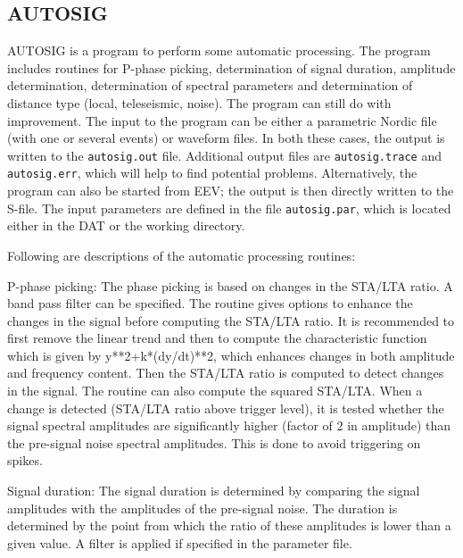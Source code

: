 
\subsection{AUTOSIG}


AUTOSIG is a program to perform some automatic processing. The program 
includes routines for P-phase picking, determination of signal duration, amplitude determination, determination of spectral parameters \citep{ottemoller2003} and determination of distance type (local, teleseismic, noise). The program can still do with improvement. The input to the program can be either a parametric Nordic file (with one or several events) or waveform files. In both these cases, the output is written to the \texttt{autosig.out} file. Additional output files are \texttt{autosig.trace} and \texttt{autosig.err}, which will help to find potential problems. Alternatively, the program can also be started from EEV; the output is then directly written to the S-file. The input parameters are defined in the file \texttt{autosig.par}, which is located either in the DAT or the working directory.  

Following are descriptions of the automatic processing routines: 

P-phase picking:\newline
{} 
The phase picking is based on changes in the STA/LTA ratio. A band pass filter can be specified. The routine gives options to enhance the changes in the signal before computing the STA/LTA ratio. It is recommended to first remove the linear trend and then to compute the characteristic function which is given by y**2+k*(dy/dt)**2, which enhances changes in both amplitude and frequency content. Then the STA/LTA ratio is computed to detect changes in the signal. The routine can also compute the squared STA/LTA. When a change is detected (STA/LTA ratio above trigger level), it is tested whether the signal spectral amplitudes are significantly higher (factor of 2 in amplitude) than the pre-signal noise spectral amplitudes. This is done to avoid triggering on spikes. 

Signal duration:\newline
{} 
The signal duration is determined by comparing the signal amplitudes with the amplitudes of the pre-signal noise. The duration is determined by the point from which the ratio of these amplitudes is lower than a given value. A filter is applied if specified in the parameter file. 

